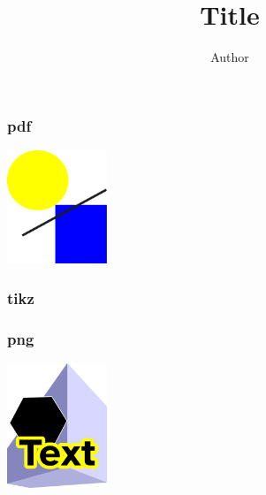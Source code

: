 \documentclass[xcolor=svgnames]{beamer}
\title{Title}
\author{Author}
\begin{document}
\frame{\titlepage}

\begin{frame}
    \frametitle{pdf}
    \includegraphics[width=3cm]{diagram.pdf}
\end{frame}


\begin{frame}
    \frametitle{tikz}
\end{frame}

\begin{frame}
        \frametitle{png}
        \includegraphics[width=3cm]{drawing.png}
    \end{frame}
\end{document}
